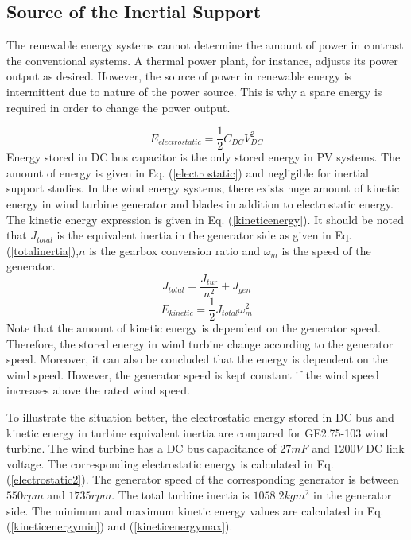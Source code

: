 \subsection{Source of the Inertial Support}
The renewable energy systems cannot determine the amount of power in contrast the conventional systems. A thermal power plant, for instance, adjusts its power output as desired. However, the source of power in renewable energy is intermittent due to nature of the power source. This is why a spare energy is required in order to change the power output. \par
\begin{equation}
E_{electrostatic}=\frac{1}{2} C_{DC}V_{DC}^{2}
\label{electrostatic}
\end{equation}
Energy stored in DC bus capacitor is the only stored energy in PV systems. The amount of energy is given in Eq. (\ref{electrostatic}) and negligible for inertial support studies. In the wind energy systems, there exists huge amount of kinetic energy in wind turbine generator and blades in addition to electrostatic energy. The kinetic energy expression is given in Eq. (\ref{kineticenergy}). It should be noted that $J_{total}$ is the equivalent inertia in the generator side as given in Eq. (\ref{totalinertia}),$n$ is the gearbox conversion ratio and $\omega_{m}$ is the speed of the generator.
\begin{equation}
J_{total}=\frac{J_{tur}}{n^{2}} + J_{gen}
\label{totalinertia}
\end{equation}
\begin{equation}
E_{kinetic}=\frac{1}{2} J_{total}\omega_{m}^{2}
\label{kineticenergy}
\end{equation}
Note that the amount of kinetic energy is dependent on the generator speed. Therefore, the stored energy in wind turbine change according to the generator speed. Moreover, it can also be concluded that the energy is dependent on the wind speed. However, the generator speed is kept constant if the wind speed increases above the rated wind speed. \par
To illustrate the situation better, the electrostatic energy stored in DC bus and kinetic energy in turbine equivalent inertia are compared for GE2.75-103 wind turbine. The wind turbine has a DC bus capacitance of $27mF$ and $1200V$ DC link voltage. The corresponding electrostatic energy is calculated in Eq. (\ref{electrostatic2}). The generator speed of the corresponding generator is between $550rpm$ and $1735rpm$. The total turbine inertia is $1058.2 kgm^2$ in the generator side. The minimum and maximum kinetic energy values are calculated in Eq. (\ref{kineticenergymin}) and (\ref{kineticenergymax}). \par
